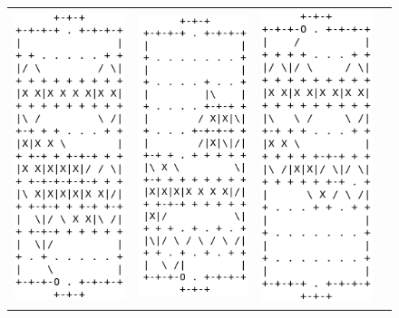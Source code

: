 \documentclass[licencjacka]{pracamgr}
\begin{document}
\begin{figure}
\centering
\setlength{\tabcolsep}{5mm}
\begin{tabular}{cccc}
  \includegraphics[width=35mm]{standard0} & \includegraphics[width=35mm]{standard1} & 
  \includegraphics[width=35mm]{standard2}\\

\end{tabular}
\end{figure}
\end{document}
